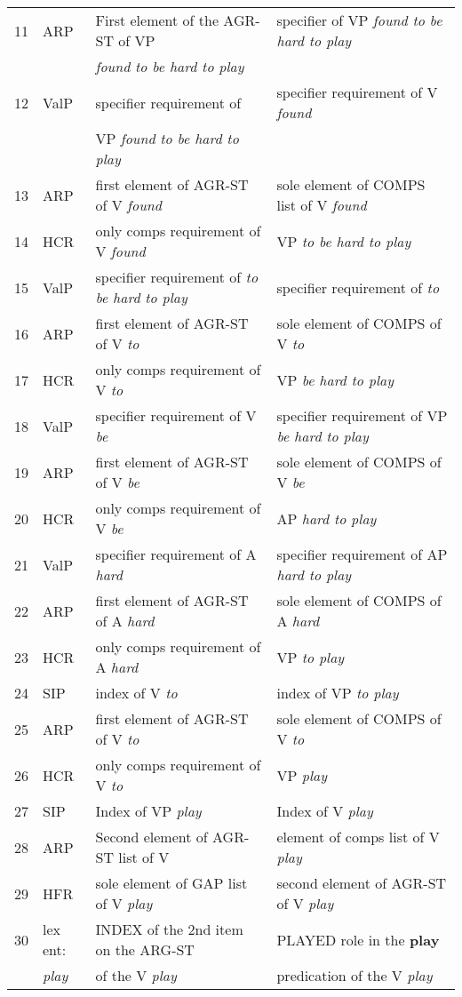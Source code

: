\documentclass{article}
\begin{document}
{\begin{footnotesize}
\begin{tabular}{|l|lll|}
    11 & ARP & First element of the AGR-ST of VP & specifier of VP {\it found to be hard to play}\\ && {\it found to be hard to play} & \\ \hline
    12 & ValP & specifier requirement  of & specifier requirement of V {\it found} \\ && VP {\it found to be hard to play} & \\ \hline
    13 & ARP & first element of AGR-ST of V {\it found} & sole element of COMPS list of V {\it found} \\ \hline
    14 & HCR & only comps requirement of V {\it found} & VP {\it to be hard to play} \\ \hline
    15 & ValP & specifier requirement of {\it to be hard to play} & specifier requirement of {\it to} \\ \hline
    16 & ARP & first element of AGR-ST of V {\it to} & sole element of COMPS of V {\it to} \\ \hline 
    17 & HCR & only comps requirement of V {\it to} & VP {\it be hard to play} \\ \hline 
    18 & ValP & specifier requirement of V {\it be} & specifier requirement of VP {\it be hard to play} \\ \hline
    19 & ARP & first element of AGR-ST of V {\it be} & sole element of COMPS of V {\it be} \\ \hline
    20 & HCR & only comps requirement of V {\it be} & AP {\it hard to play} \\ \hline
    21 & ValP & specifier requirement of A {\it hard} & specifier requirement of AP {\it hard to play} \\ \hline
    22 & ARP & first element of AGR-ST of A {\it hard} & sole element of COMPS of A {\it hard} \\ \hline
    23 & HCR & only comps requirement of A {\it hard} & VP {\it to play} \\ \hline
    24 & SIP & index of V {\it to} & index of  VP {\it to play} \\ \hline
    25 & ARP & first element of AGR-ST of V {\it to} & sole element of COMPS of V {\it to} \\ \hline
    26 & HCR & only comps requirement of V {\it to} & VP {\it play} \\ \hline
    27 & SIP & Index of VP {\it play} & Index of V {\it play} \\ \hline
    28 & ARP & Second element of AGR-ST list of V & element of comps list of V {\it play} \\ \hline
    29 & HFR & sole element of GAP list of V {\it play} & second element of AGR-ST of V {\it play} \\ \hline
    30 & lex ent: & INDEX of the 2nd item on the ARG-ST & PLAYED role in the {\bf play}\\ &
{\it play} & of the V {\it play} & predication of the V {\it play}\\ \hline
\end{tabular}
\end{footnotesize}}
\end{document}
